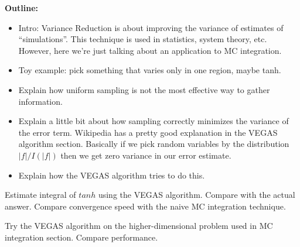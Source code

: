 

{\bf Outline:}
\begin{itemize}
\item Intro: Variance Reduction is about improving the variance of estimates of ``simulations''. This technique is used in statistics, system theory, etc. However, here we're just talking about an application to MC integration.
\item Toy example: pick something that varies only in one region, maybe tanh.
\item Explain how uniform sampling is not the most effective way to gather information.
\item Explain a little bit about how sampling correctly minimizes the variance of the error term. Wikipedia has a pretty good explanation in the VEGAS algorithm section. Basically if we pick random variables by the distribution $|f|/I(|f|)$ then we get zero variance in our error estimate.
\item Explain how the VEGAS algorithm tries to do this.
\end{itemize}

\begin{problem}
Estimate integral of $tanh$ using the VEGAS algorithm. Compare with the actual answer. Compare convergence speed with the naive MC integration technique.
\end{problem}

\begin{problem}
Try the VEGAS algorithm on the higher-dimensional problem used in MC integration section. Compare performance.
\end{problem}
